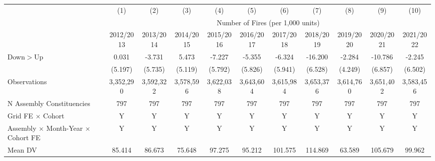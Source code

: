 \begin{tabular}{lcccccccccc} \hline
 & (1) & (2) & (3) & (4) & (5) & (6) & (7) & (8) & (9) & (10) \\
 & \multicolumn{10}{c}{Number of Fires (per 1,000 units)}\\
 & 2012/2013 & 2013/2014 & 2014/2015 & 2015/2016 & 2016/2017 & 2017/2018 & 2018/2019 & 2019/2020 & 2020/2021 & 2021/2022 \\ \hline

Down$>$Up   &       0.031         &      -3.731         &       5.473         &      -7.227         &      -5.355         &      -6.324         &     -16.200\sym{**} &      -2.284         &     -10.786         &      -2.245         \\
            &     (5.197)         &     (5.735)         &     (5.119)         &     (5.792)         &     (5.826)         &     (5.941)         &     (6.528)         &     (4.249)         &     (6.857)         &     (6.502)         \\
\hline
Observations&   3,352,290         &   3,592,322         &   3,578,596         &   3,622,038         &   3,643,604         &   3,615,984         &   3,653,376         &   3,614,760         &   3,651,402         &   3,583,456         \\
N Assembly Constituencies&         797         &         797         &         797         &         797         &         797         &         797         &         797         &         797         &         797         &         797         \\
Grid FE $\times$ Cohort&           Y         &           Y         &           Y         &           Y         &           Y         &           Y         &           Y         &           Y         &           Y         &           Y         \\
Assembly $\times$ Month-Year $\times$ Cohort FE&           Y         &           Y         &           Y         &           Y         &           Y         &           Y         &           Y         &           Y         &           Y         &           Y         \\
Mean DV     &      85.414         &      86.673         &      75.648         &      97.275         &      95.212         &     101.575         &     114.869         &      63.589         &     105.679         &      99.962         \\
\hline
\end{tabular}
